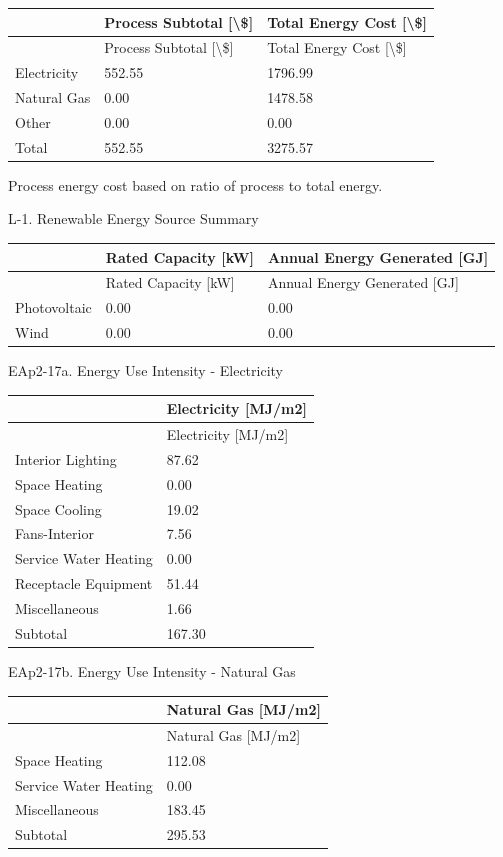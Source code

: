 \begin{longtable}[c]{>{\raggedright}p{1.5in}>{\raggedright}p{2.21in}>{\raggedright}p{2.28in}}
\toprule
 & Process Subtotal [\textbackslash\$] & Total Energy Cost [\textbackslash\$] \tabularnewline
\midrule
\endfirsthead

\toprule
 & Process Subtotal [\textbackslash\$] & Total Energy Cost [\textbackslash\$] \tabularnewline
\midrule
\endhead

Electricity & 552.55 & 1796.99 \tabularnewline
Natural Gas & 0.00 & 1478.58 \tabularnewline
Other & 0.00 & 0.00 \tabularnewline
Total & 552.55 & 3275.57 \tabularnewline
\bottomrule
\end{longtable}

Process energy cost based on ratio of process to total energy.

L-1. Renewable Energy Source Summary

\begin{longtable}[c]{@{}lll@{}}
\toprule
 & Rated Capacity [kW] & Annual Energy Generated [GJ] \tabularnewline
\midrule
\endfirsthead

\toprule
 & Rated Capacity [kW] & Annual Energy Generated [GJ] \tabularnewline
\midrule
\endhead

Photovoltaic & 0.00 & 0.00 \tabularnewline
Wind & 0.00 & 0.00 \tabularnewline
\bottomrule
\end{longtable}

EAp2-17a. Energy Use Intensity - Electricity

\begin{longtable}[c]{@{}ll@{}}
\toprule
 & Electricity [MJ/m2] \tabularnewline
\midrule
\endfirsthead

\toprule
 & Electricity [MJ/m2] \tabularnewline
\midrule
\endhead

Interior Lighting & 87.62 \tabularnewline
Space Heating & 0.00 \tabularnewline
Space Cooling & 19.02 \tabularnewline
Fans-Interior & 7.56 \tabularnewline
Service Water Heating & 0.00 \tabularnewline
Receptacle Equipment & 51.44 \tabularnewline
Miscellaneous & 1.66 \tabularnewline
Subtotal & 167.30 \tabularnewline
\bottomrule
\end{longtable}

EAp2-17b. Energy Use Intensity - Natural Gas

\begin{longtable}[c]{@{}ll@{}}
\toprule
 & Natural Gas [MJ/m2] \tabularnewline
\midrule
\endfirsthead

\toprule
 & Natural Gas [MJ/m2] \tabularnewline
\midrule
\endhead

Space Heating & 112.08 \tabularnewline
Service Water Heating & 0.00 \tabularnewline
Miscellaneous & 183.45 \tabularnewline
Subtotal & 295.53 \tabularnewline
\bottomrule
\end{longtable}

